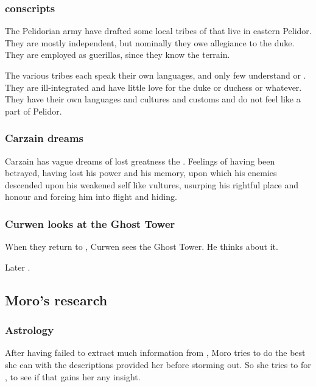 \begin{garbage}
\subsubsection{\Meccaran{} conscripts}
The Pelidorian army have drafted some local tribes of \meccara{} that live in eastern Pelidor. 
They are mostly independent, but nominally they owe allegiance to the duke. 
They are employed as guerillas, since they know the terrain. 

The various tribes each speak their own languages, and only few understand \Velcadian{} or \Tepharin. 
They are ill-integrated and have little love for the duke or duchess or whatever. 
They have their own languages and cultures and customs and do not feel like a part of Pelidor. 





\subsubsection{Carzain dreams}
Carzain has vague dreams of lost greatness the {\Mystraacht{} \matrix}. 
Feelings of having been betrayed, having lost his power and his memory, upon which his enemies descended upon his weakened self like vultures, usurping his rightful place and honour and forcing him into flight and hiding. 





\subsubsection{Curwen looks at the Ghost Tower}
When they return to \Forklin, Curwen sees the Ghost Tower. 
He thinks about it.

Later . 











\subsection{Moro's research}






\subsubsection{Astrology}
After having failed to extract much information from \Tiroco, Moro tries to do the best she can with the descriptions \Tiroco{} provided her before storming out. 
So she tries to  for \Tiroco, to see if that gains her any insight. 


\end{garbage}
